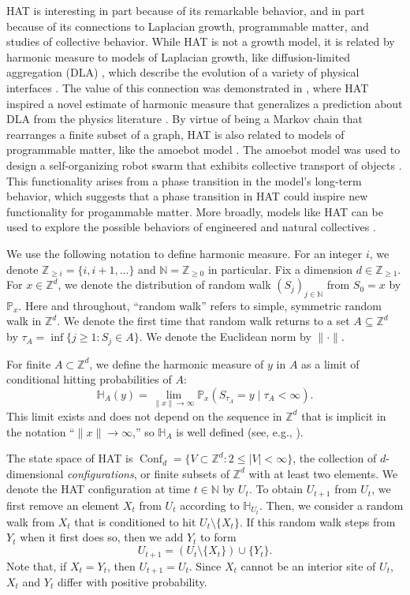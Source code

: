 \documentclass[11pt,reqno]{amsart}
\theoremstyle{definition}
\numberwithin{equation}{section}
\newcommand{\N}{\mathbb{N}}
\newcommand{\Z}{\mathbb{Z}}
\renewcommand{\P}{\mathbb{P}}
\newcommand{\1}{\mathbf{1}}
\renewcommand{\H}{\mathbb{H}}
\DeclareMathOperator{\Conf}{\mathrm{Conf}}
\begin{document}
HAT is interesting in part because of its remarkable behavior, and in part because of its connections to Laplacian growth, programmable matter, and studies of collective behavior. While HAT is not a growth model, it is related by harmonic measure to models of Laplacian growth, like diffusion-limited aggregation (DLA) \cite{witten1981}, which describe the evolution of a variety of physical interfaces \cite{MR3662912}. The value of this connection was demonstrated in \cite{calvert2021}, where HAT inspired a novel estimate of harmonic measure that generalizes a prediction about DLA from the physics literature \cite{lee1988}. By virtue of being a Markov chain that rearranges a finite subset of a graph, HAT is also related to models of programmable matter, like the amoebot model \cite{derakshandeh2014,cannon2016}. The amoebot model was used to design a self-organizing robot swarm that exhibits collective transport of objects \cite{li2021}. This functionality arises from a phase transition in the model's long-term behavior, which suggests that a phase transition in HAT could inspire new functionality for progammable matter. More broadly, models like HAT can be used to explore the possible behaviors of engineered and natural collectives \cite{calvert2023}.


We use the following notation to define harmonic measure. For an integer $i$, we denote $\Z_{\geq i} = \{i, i+1, \dots\}$ and $\N = \Z_{\geq 0}$ in particular. Fix a dimension $d \in \Z_{\geq 1}$. For $x \in \Z^d$, we denote the distribution of random walk $(S_j)_{j \in \N}$ from $S_0 = x$ by $\P_x$. Here and throughout, ``random walk'' refers to simple, symmetric random walk in $\Z^d$. We denote the first time that random walk returns to a set $A \subseteq \Z^d$ by $\tau_A = \inf\{j \geq 1: S_j \in A\}$. We denote the Euclidean norm by $\|{\cdot}\|$.

For finite $A \subset \Z^d$, we define the harmonic measure of $y$ in $A$ as a limit of conditional hitting probabilities of $A$:
\begin{equation}\label{lim him}
\H_A (y) = \lim_{\| x \| \to \infty} \P_x (S_{\tau_A} = y \mid \tau_A < \infty ).
\end{equation}
This limit exists and does not depend on the sequence in $\Z^d$ that is implicit in the notation ``$\|x\| \to \infty$,'' so $\H_A$ is well defined (see, e.g., \cite[Chapter 2]{lawler2013intersections}). 

The state space of HAT is $\Conf_d = \{V \subset \Z^d: 2 \leq |V| < \infty \}$, the collection of $d$-dimensional {\em configurations}, or finite subsets of $\Z^d$ with at least two elements. We denote the HAT configuration at time $t \in \N$ by $U_t$. To obtain $U_{t+1}$ from $U_t$, we first remove an element $X_t$ from $U_t$ according to $\H_{U_t}$. Then, we consider a random walk from $X_t$ that is conditioned to hit $U_t {\setminus} \{X_t\}$. If this random walk steps from $Y_t$ when it first does so, then we add $Y_t$ to form
\[
U_{t+1} = (U_t \setminus \{X_t\}) \cup \{Y_t\}.
\]
Note that, if $X_t = Y_t$, then $U_{t+1} = U_t$. Since $X_t$ cannot be an interior site of $U_t$, $X_t$ and $Y_t$ differ with positive probability.
\end{document}
